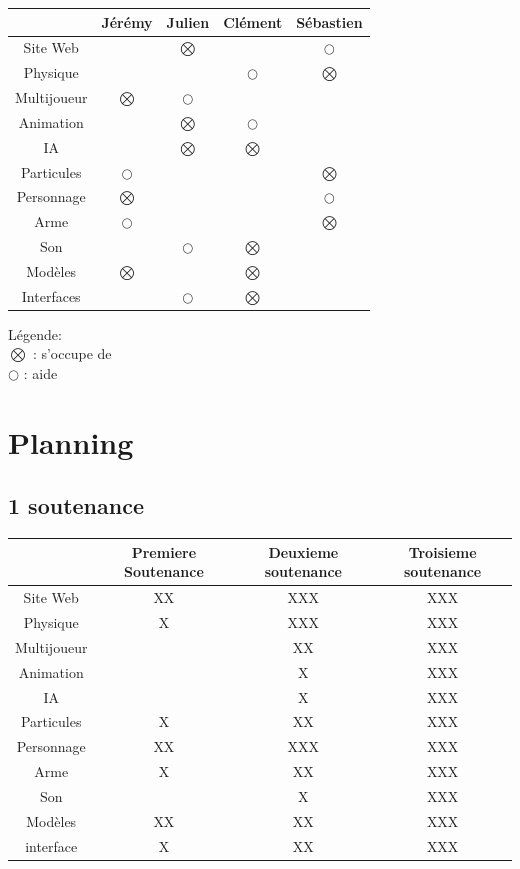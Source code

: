 ﻿\documentclass{article}
\begin{document}
\begin{tabular}{|c|c|c|c|c|}
\hline
			&	Jérémy		&	Julien		&	Clément		&	Sébastien	\\ \hline
Site Web	&				& $\bigotimes$	& 				& $\bigcirc$	\\ \hline
Physique	&				&				& $\bigcirc$	& $\bigotimes$	\\ \hline
Multijoueur	& $\bigotimes$	& $\bigcirc$	&				& 				\\ \hline
Animation	&				& $\bigotimes$	& $\bigcirc$	&				\\ \hline
IA		& 	&		$\bigotimes$		& $\bigotimes$	&				
\\ \hline
Particules	& $\bigcirc$	& 				&				& $\bigotimes$	\\ \hline
Personnage	& $\bigotimes$	&				& 				& $\bigcirc$	\\ \hline
Arme		& $\bigcirc$	&				&				& $\bigotimes$	\\ \hline
Son			&				& $\bigcirc$	& $\bigotimes$	&			
\\ \hline
Modèles		& $\bigotimes$	&				& $\bigotimes$	&				\\ \hline
Interfaces	& 				& $\bigcirc$	& $\bigotimes$	&				\\ \hline
\end{tabular}

Légende:\\
$\bigotimes$ : s'occupe de\\
$\bigcirc$ : aide

\section{Planning}
\subsection{1\iere{} soutenance}
\begin{tabular}{|c|c|c|c|}
\hline
			&	Premiere Soutenance & Deuxieme soutenance & Troisieme soutenance	\\ \hline
Site Web	&	XX		&XXX & XXX	\\ \hline
Physique	&	X	&XXX	&XXX	\\ \hline
Multijoueur	&		&XX		&XXX \\ \hline
Animation	&		&X	&XXX	\\ \hline
IA	        &			&X &XXX	\\ \hline
Particules	&	X		&XX	&XXX\\ \hline
Personnage	&	XX		&XXX&XXX	\\ \hline
Arme		&	X		&XX	&XXX\\ \hline
Son		&			&X	&XXX\\ \hline
Modèles		&	XX		&XX	&XXX\\ \hline
interface	&	X	    &XX    &XXX        \\ \hline
\end{tabular}
\end{document}
